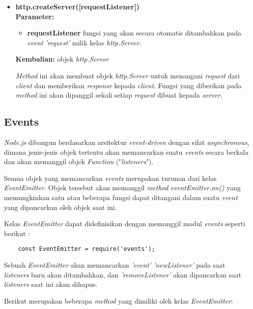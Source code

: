 \begin{itemize}
	\item \textbf{http.createServer([requestListener])} \\ \textbf{Parameter:}
	\begin{itemize}
		\item \textbf{requestListener} fungsi yang akan secara otomatis ditambahkan pada \textit{event} \textit{'request'} milik kelas \textit{http.Server}.
	\end{itemize}
	\textbf{Kembalian:} objek \textit{http.Server}
	
	\textit{Method} ini akan membuat objek \textit{http.Server} untuk menangani \textit{request} dari \textit{client} dan memberikan \textit{response} kepada \textit{client}. Fungsi yang diberikan pada \textit{method} ini akan dipanggil sekali setiap \textit{request} dibuat kepada \textit{server}.
\end{itemize}

\subsection{Events}
\textit{Node.js} dibangun berdasarkan arsitektur \textit{event-driven} dengan sifat \textit{asynchronous}, dimana jenis-jenis objek tertentu akan memancarkan suatu \textit{events} secara berkala dan akan memanggil objek \textit{Function} ("\textit{listeners}").

Semua objek yang memancarkan \textit{events} merupakan turunan dari kelas \textit{EventEmitter}. Objek tersebut akan memanggil \textit{method} \textit{eventEmitter.on()} yang memungkinkan satu atau beberapa fungsi dapat ditangani dalam suatu \textit{event} yang dipancarkan oleh objek saat ini.

Kelas \textit{EventEmitter} dapat didefinisikan dengan memanggil modul \textit{events} seperti berikut :

\begin{lstlisting}
	const EventEmitter = require('events');
\end{lstlisting}

Sebuah \textit{EventEmitter} akan memancarkan \textit{'event'} \textit{'newListener'} pada saat \textit{listeners} baru akan ditambahkan, dan \textit{'removeListener'} akan dipancarkan saat \textit{listeners} saat ini akan dihapus.

Berikut merupakan beberapa \textit{method} yang dimiliki oleh kelas \textit{EventEmitter}:

